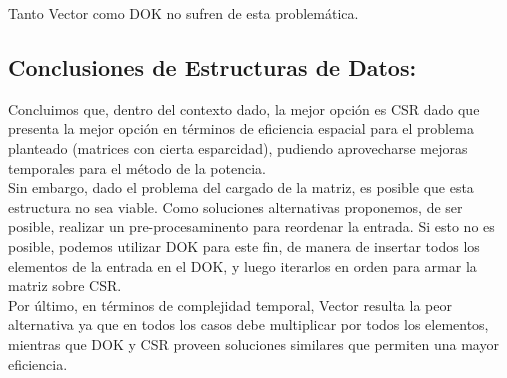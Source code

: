 Tanto Vector como DOK no sufren de esta problemática.

\subsection{Conclusiones de Estructuras de Datos:}

Concluimos que, dentro del contexto dado, la mejor opción es CSR dado que presenta la mejor opción en términos de eficiencia espacial para el problema planteado (matrices con cierta esparcidad), pudiendo aprovecharse mejoras temporales para el método de la potencia.\\
Sin embargo, dado el problema del cargado de la matriz, es posible que esta estructura no sea viable. Como soluciones alternativas proponemos, de ser posible, realizar un pre-procesaminento para reordenar la entrada. Si esto no es posible, podemos utilizar DOK para este fin, de manera de insertar todos los elementos de la entrada en el DOK, y luego iterarlos en orden para armar la matriz sobre CSR.\\
Por último, en términos de complejidad temporal, Vector resulta la peor alternativa ya que en todos los casos debe multiplicar por todos los elementos, mientras que DOK y CSR proveen soluciones similares que permiten una mayor eficiencia.
